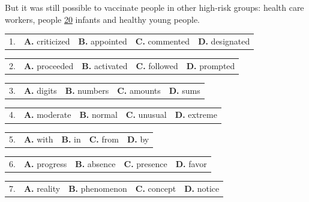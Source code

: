 \documentclass[UTF8,11pt]{ctexart}
\begin{document}
But it was still possible to vaccinate people in other high-risk groups: health care workers, people \uline{20} infants and healthy young people.


\noindent\begin{tabularx}{\linewidth}{@{}lXXXX@{}}1. & \textbf{A.} criticized & \textbf{B.} appointed & \textbf{C.} commented & \textbf{D.} designated\\\end{tabularx}\par

\noindent\begin{tabularx}{\linewidth}{@{}lXXXX@{}}2. & \textbf{A.} proceeded & \textbf{B.} activated & \textbf{C.} followed & \textbf{D.} prompted\\\end{tabularx}\par

\noindent\begin{tabularx}{\linewidth}{@{}lXXXX@{}}3. & \textbf{A.} digits & \textbf{B.} numbers & \textbf{C.} amounts & \textbf{D.} sums\\\end{tabularx}\par

\noindent\begin{tabularx}{\linewidth}{@{}lXXXX@{}}4. & \textbf{A.} moderate & \textbf{B.} normal & \textbf{C.} unusual & \textbf{D.} extreme\\\end{tabularx}\par

\noindent\begin{tabularx}{\linewidth}{@{}lXXXX@{}}5. & \textbf{A.} with & \textbf{B.} in & \textbf{C.} from & \textbf{D.} by\\\end{tabularx}\par

\noindent\begin{tabularx}{\linewidth}{@{}lXXXX@{}}6. & \textbf{A.} progress & \textbf{B.} absence & \textbf{C.} presence & \textbf{D.} favor\\\end{tabularx}\par

\noindent\begin{tabularx}{\linewidth}{@{}lXXXX@{}}7. & \textbf{A.} reality & \textbf{B.} phenomenon & \textbf{C.} concept & \textbf{D.} notice\\\end{tabularx}\par
\end{document}
